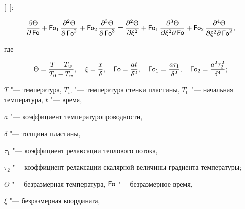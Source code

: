 [--]:

\begin{equation}

\label{kud:eq13}

\frac{\partial  \Theta}{\partial \operatorname{\sf Fo}}+\operatorname{\sf Fo}_1

\frac{\partial ^2 \Theta}{\partial \operatorname{\sf Fo}^2}+\operatorname{\sf Fo}_2

\frac{\partial ^3 \Theta}{\partial \operatorname{\sf Fo}^3}=\frac{\partial

^2 \Theta}{\partial \xi^2}+\operatorname{\sf Fo}_1

\frac{\partial^3 \Theta}{\partial \xi^2\partial

\operatorname{\sf Fo}}+\operatorname{\sf Fo}_2 \frac{\partial ^4 \Theta}{\partial

 \xi^2 \partial \operatorname{\sf Fo}^2},

\end{equation}

где 

$$ 

\Theta=\frac{T-T_{w}}{T_0 -T_{w}},

\quad \xi=\frac{x}{\delta}, \quad 

\operatorname{\sf Fo}=\frac{at}{\delta ^2},

\quad 

\operatorname{\sf Fo}_1 =\frac{a \tau_1}{\delta^2}, 

\quad 

\operatorname{\sf Fo}_2 =\frac{a^2 \tau_2^2}{\delta^4};

$$


$T$ "--- температура, $T_{w}$ "--- температура стенки пластины, $T_{0}$ "--- начальная температура, $t$ "--- время,

$a$ "--- коэффициент температуропроводности, 

$\delta $ "--- толщина пластины, 

$\tau_1$ "--- коэффициент релаксации теплового потока,

$\tau_2$ "--- коэффициент релаксации скалярной величины градиента температуры;

 $\Theta$ "--- безразмерная температура, $\operatorname{\sf Fo}$ "--- безразмерное время,

$\xi$ "--- безразмерная координата, 


